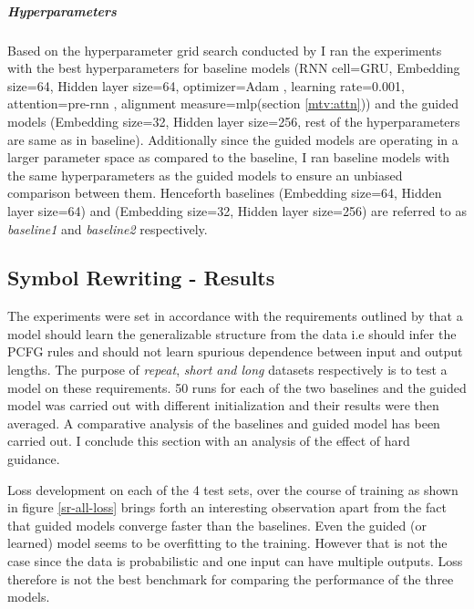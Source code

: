\subparagraph{Hyperparameters} Based on the hyperparameter grid search conducted by \cite{Hupkes2018} I ran the experiments with the best hyperparameters for baseline models (RNN cell=GRU, Embedding size=64, Hidden layer size=64, optimizer=Adam \citep{KingmaB14}, learning rate=0.001, attention=pre-rnn \citep{Bahdanau2014}, alignment measure=mlp(section \ref{mtv:attn})) and the guided models (Embedding size=32, Hidden layer size=256, rest of the hyperparameters are same as in baseline). Additionally since the guided models are operating in a larger parameter space as compared to the baseline, I ran baseline models with the same hyperparameters as the guided models to ensure an unbiased comparison between them. Henceforth baselines (Embedding size=64, Hidden layer size=64) and (Embedding size=32, Hidden layer size=256) are referred to as \textit{baseline1} and \textit{baseline2} respectively.

\subsection{Symbol Rewriting - Results}
The experiments were set in accordance with the requirements outlined by \cite{Weber2018} that a model should learn the generalizable structure from the data i.e should infer the PCFG rules and should not learn spurious dependence between input and output lengths. The purpose of \textit{repeat}, \textit{short and long} datasets respectively is to test a model on these requirements. 50 runs for each of the two baselines and the guided model was carried out with different initialization and their results were then averaged. A comparative analysis of the baselines and guided model has been carried out. I conclude this section with an analysis of the effect of hard guidance.

Loss development on each of the 4 test sets, over the course of training as shown in figure \ref{sr-all-loss} brings forth an interesting observation apart from the fact that guided models converge faster than the baselines. Even the guided (or learned) model seems to be overfitting to the training. However that is not the case since the data is probabilistic and one input can have multiple outputs. Loss therefore is not the best benchmark for comparing the performance of the three models.

